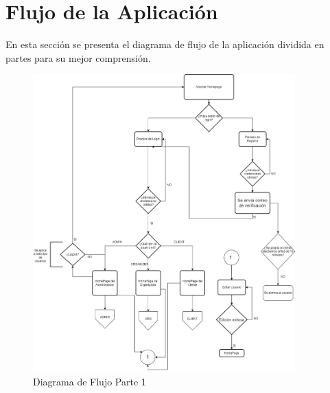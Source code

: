 \newpage
\section{Flujo de la Aplicación}

En esta sección se presenta el diagrama de flujo de la aplicación dividida en partes para su mejor comprensión.
\begin{figure}[h]
    \centering
    \includegraphics[width=0.9\textwidth]{FlujoGeneral.png} 
    \caption{Diagrama de Flujo Parte 1}
    \label{fig:flujoEvs}
\end{figure}
\newpage

